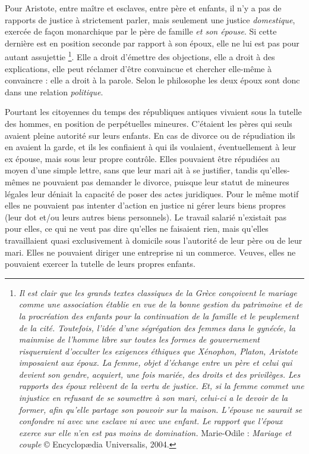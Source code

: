 Pour Aristote, entre maître et esclaves, entre père et enfants, il n'y
a pas de rapports de justice à strictement parler, mais seulement une
justice \emph{domestique}, exercée de façon monarchique par le père de famille \emph{et
son épouse}. Si cette dernière est en position seconde par rapport à son
époux, elle ne lui est pas pour autant assujettie%
\footnote{{\emph{Il est clair que les grands textes classiques de la Grèce conçoivent le mariage comme une association établie en vue de la bonne gestion du patrimoine et de la procréation des enfants pour la continuation de la famille et le peuplement de la cité. Toutefois, l'idée d'une ségrégation des femmes dans le gynécée, la mainmise de l'homme libre sur toutes les formes de gouvernement risqueraient d'occulter les exigences éthiques que Xénophon, Platon, Aristote imposaient aux époux. La femme, objet d'échange entre un père et celui qui devient son gendre, acquiert, une fois mariée, des droits et des privilèges. Les rapports des époux relèvent de la vertu de justice. Et, si la femme commet une injustice en refusant de se soumettre à son mari, celui-ci a le devoir de la former, afin qu'elle partage son pouvoir sur la maison. L'épouse ne saurait se confondre ni avec une esclave ni avec une enfant. Le rapport que l'époux exerce sur elle n'en est pas moins de domination.}}
Marie-Odile  : \emph{Mariage et couple} © Encyclopædia Universalis, 2004.}.
Elle a droit
d'émettre des objections, elle a droit à des explications, elle peut
réclamer d'être convaincue et chercher elle-même à convaincre : elle a
droit à la parole. Selon le philosophe les deux époux sont donc dans
une relation \emph{politique}. 

Pourtant les citoyennes du temps des républiques antiques vivaient sous la
tutelle des hommes, en position de perpétuelles mineures. C'étaient les pères qui seuls avaient pleine autorité
sur leurs enfants. En cas de divorce ou de répudiation ils en avaient la
garde, et ils les confiaient à qui ils voulaient, éventuellement à leur ex
épouse, mais sous leur propre contrôle. Elles pouvaient
être répudiées au moyen d'une simple lettre, sans que leur mari ait
à se justifier, tandis qu'elles-mêmes ne pouvaient pas demander le divorce,
puisque leur statut de mineures légales leur déniait la capacité de poser des actes juridiques. Pour le même motif elles ne pouvaient
pas intenter d'action en justice ni gérer leurs biens propres
(leur dot et/ou leurs autres biens personnels). Le travail salarié
n'existait pas pour elles, ce qui ne veut pas dire qu'elles ne faisaient
rien, mais qu'elles travaillaient quasi exclusivement
à domicile sous l'autorité de leur père ou de leur mari.  Elles ne pouvaient
diriger une entreprise ni un commerce. Veuves, elles ne pouvaient
exercer la tutelle de leurs propres enfants. 





